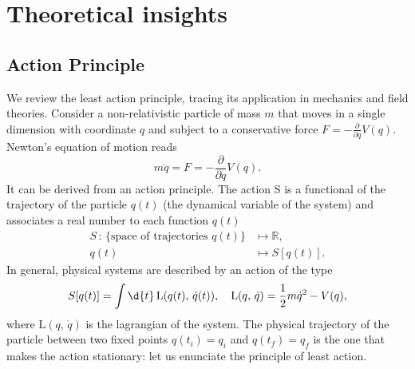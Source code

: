 \section{Theoretical insights} \label{app:insights}

\subsection*{Action Principle}\label{app:action_noether}

We review the least action principle, tracing its application in mechanics and field theories. Consider a non-relativistic particle of mass \(m\) that moves in a single dimension with coordinate \(q\) and subject to a conservative force \(F = - \frac{\partial}{\partial q} V(q)\). Newton’s equation of motion reads
\[
    m \ddot{q} = F = - \frac{\partial}{\partial q} V(q).
\]
It can be derived from an action principle. The action S is a functional of the trajectory of the particle $q(t)$ (the dynamical variable of the system) and associates a real number to each function $q(t)$
\[
    \begin{aligned}
        S \, : \, \{\text{space of trajectories } q(t)\} & \mapsto \mathbb{R}, \\
        q(t)                                             & \mapsto S[q(t)].
    \end{aligned}
\]
In general, physical systems are described by an action of the type
\[
    S[q(t)] = \int \d{t} \, \mathrm{L}(q(t),\,\dot{q}(t)), \quad \mathrm{L}(q,\,\dot{q}) = \frac{1}{2} m \dot{q}^2 - V(q),
\]
where \(\mathrm{L}(q,\,\dot{q})\) is the lagrangian of the system. The physical trajectory of the particle between two fixed points \(q(t_i) = q_i\) and \(q(t_f) = q_f\) is the one that makes the action stationary: let us enunciate the principle of least action.

